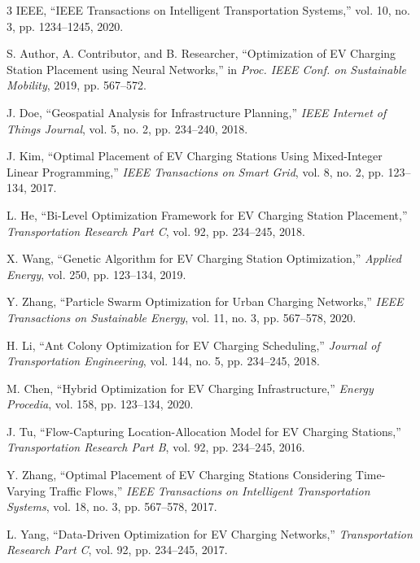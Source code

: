 \documentclass[journal]{IEEEtran}
\begin{document}
\begin{thebibliography}{3}
IEEE, ``IEEE Transactions on Intelligent Transportation Systems,'' vol. 10, no. 3, pp. 1234--1245, 2020.

S. Author, A. Contributor, and B. Researcher, ``Optimization of EV Charging Station Placement using Neural Networks,'' in \emph{Proc. IEEE Conf. on Sustainable Mobility}, 2019, pp. 567--572.

J. Doe, ``Geospatial Analysis for Infrastructure Planning,'' \emph{IEEE Internet of Things Journal}, vol. 5, no. 2, pp. 234--240, 2018.

J. Kim, ``Optimal Placement of EV Charging Stations Using Mixed-Integer Linear Programming,'' \emph{IEEE Transactions on Smart Grid}, vol. 8, no. 2, pp. 123--134, 2017.

L. He, ``Bi-Level Optimization Framework for EV Charging Station Placement,'' \emph{Transportation Research Part C}, vol. 92, pp. 234--245, 2018.

X. Wang, ``Genetic Algorithm for EV Charging Station Optimization,'' \emph{Applied Energy}, vol. 250, pp. 123--134, 2019.

Y. Zhang, ``Particle Swarm Optimization for Urban Charging Networks,'' \emph{IEEE Transactions on Sustainable Energy}, vol. 11, no. 3, pp. 567--578, 2020.

H. Li, ``Ant Colony Optimization for EV Charging Scheduling,'' \emph{Journal of Transportation Engineering}, vol. 144, no. 5, pp. 234--245, 2018.

M. Chen, ``Hybrid Optimization for EV Charging Infrastructure,'' \emph{Energy Procedia}, vol. 158, pp. 123--134, 2020.

J. Tu, ``Flow-Capturing Location-Allocation Model for EV Charging Stations,'' \emph{Transportation Research Part B}, vol. 92, pp. 234--245, 2016.

Y. Zhang, ``Optimal Placement of EV Charging Stations Considering Time-Varying Traffic Flows,'' \emph{IEEE Transactions on Intelligent Transportation Systems}, vol. 18, no. 3, pp. 567--578, 2017.

L. Yang, ``Data-Driven Optimization for EV Charging Networks,'' \emph{Transportation Research Part C}, vol. 92, pp. 234--245, 2017.


\end{thebibliography}
\end{document}
